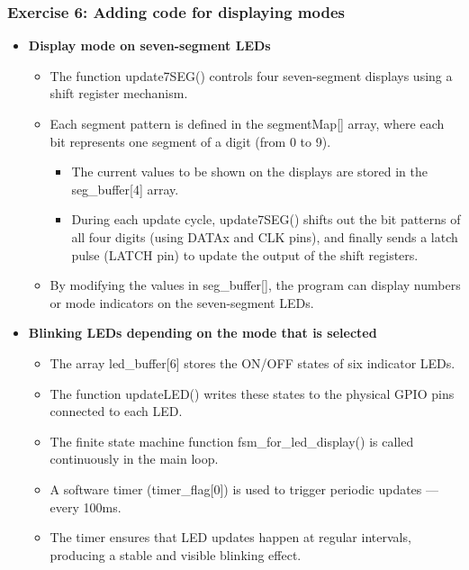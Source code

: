 \documentclass[a4paper,12pt]{article}
\begin{document}
\subsubsection{Exercise 6: Adding code for displaying modes}
\begin{itemize}
	\item[] \textbf{Display mode on seven-segment LEDs}
	\begin{itemize}
		\item[] The function update7SEG() controls four seven-segment displays using a shift register mechanism.
		\item[] Each segment pattern is defined in the segmentMap[] array, where each bit represents one segment of a digit (from 0 to 9).
		\begin{itemize}
			\item[] The current values to be shown on the displays are stored in the seg\_buffer[4] array.
			\item[] During each update cycle, update7SEG() shifts out the bit patterns of all four digits (using DATAx and CLK pins), and finally sends a latch pulse (LATCH pin) to update the output of the shift registers.
		\end{itemize}
		\item[] By modifying the values in seg\_buffer[], the program can display numbers or mode indicators on the seven-segment LEDs.
	\end{itemize}
	\item[] \textbf{Blinking LEDs depending on the mode that is selected}
	\begin{itemize}
		\item[] The array led\_buffer[6] stores the ON/OFF states of six indicator LEDs.
		\item[] The function updateLED() writes these states to the physical GPIO pins connected to each LED.
		\item[] The finite state machine function fsm\_for\_led\_display() is called continuously in the main loop.
		\item[] A software timer (timer\_flag[0]) is used to trigger periodic updates — every 100ms.
		\item[] The timer ensures that LED updates happen at regular intervals, producing a stable and visible blinking effect.
	\end{itemize}
\end{itemize}
\end{document}
